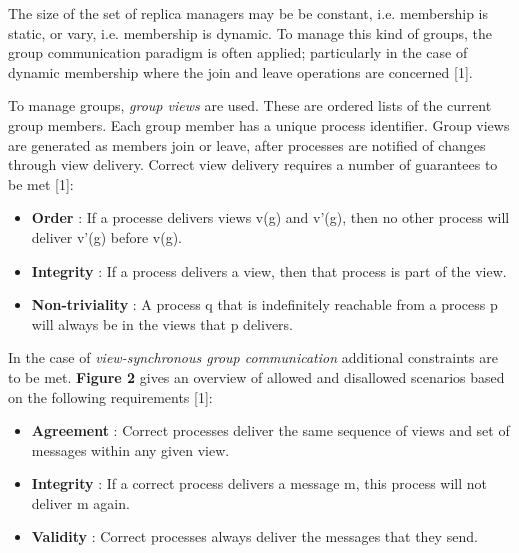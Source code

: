 The size of the set of replica managers may be be constant, i.e. membership is static, or vary, i.e. membership is dynamic. To manage this kind of groups, the group communication paradigm is often applied; particularly in the case of dynamic membership where the join and leave operations are concerned [1].

To manage groups, \emph{group views} are used. These are ordered lists of the current group members. Each group member has a unique process identifier. Group views are generated as members join or leave, after processes are notified of changes through view delivery. Correct view delivery requires a number of guarantees to be met [1]:
\begin{itemize}
	\item \textbf{Order} : If a processe delivers views v(g) and v'(g), then no other process will deliver v'(g) before v(g).
	\item \textbf{Integrity} : If a process delivers a view, then that process is part of the view.
	\item \textbf{Non-triviality} : A process q that is indefinitely reachable from a process p will always be in the views that p delivers.
\end{itemize}
In the case of \emph{view-synchronous group communication} additional constraints are to be met. \textbf{Figure 2} gives an overview of allowed and disallowed scenarios based on the following requirements [1]:
\begin{itemize}
	\item \textbf{Agreement} : Correct processes deliver the same sequence of views and set of messages within any given view.
	\item \textbf{Integrity} : If a correct process delivers a message m, this process will not deliver m again.
	\item \textbf{Validity} : Correct processes always deliver the messages that they send.
\end{itemize}



